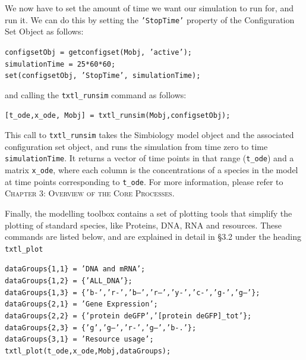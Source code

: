 \documentclass[english]{report}
\begin{document}
We now have to set the amount of time we want our simulation to run for, and run it. We can do this by setting the \texttt{'StopTime'} property of the Configuration Set Object as follows:

				\begin{flushleft}
						\texttt{configsetObj = getconfigset(Mobj, 'active');\\
simulationTime = 25*60*60;\\
set(configsetObj, 'StopTime', simulationTime);} \\	
				\end{flushleft}		
and calling the \texttt{txtl\_runsim} command as follows:	

				\begin{flushleft}
						\texttt{[t\_ode,x\_ode, Mobj] = txtl\_runsim(Mobj,configsetObj);} \\	
				\end{flushleft}	
This call to \texttt{txtl\_runsim} takes the Simbiology model object and the associated configuration set object, and runs the simulation from time zero to time \texttt{simulationTime}. It returns a vector of time points in that range (\texttt{t\_ode}) and a matrix \texttt{x\_ode}, where each column is the concentrations of a species in the model at time points corresponding to \texttt{t\_ode}. For more information, please refer to \textsc{Chapter 3: Overview of the Core Processes}. 

Finally, the modelling toolbox contains a set of plotting tools that simplify the plotting of standard species, like Proteins, DNA, RNA and resources. These commands are listed below, and are explained in detail in \S 3.2 under the heading \texttt{txtl\_plot}

				 \begin{flushleft}
						 \texttt{\noindent dataGroups\{1,1\} = 'DNA and mRNA'; \\
						dataGroups\{1,2\} = \{'ALL\_DNA'\};\\ 
						dataGroups\{1,3\} = \{'b-','r-','b--','r--','y-','c-','g-','g--'\};\\}
						\vspace*{1\baselineskip}
						\texttt{\noindent dataGroups\{2,1\} = 'Gene Expression';\\
						dataGroups\{2,2\} = \{'protein deGFP\textasteriskcentered','[protein deGFP]\_tot'\};\\
						dataGroups\{2,3\} = \{'g','g--','r-','g--','b-.'\};\\}
						\vspace*{1\baselineskip}
						\texttt{\noindent dataGroups\{3,1\} = 'Resource usage';\\}
						\vspace*{1\baselineskip}
						 \texttt{\noindent txtl\_plot(t\_ode,x\_ode,Mobj,dataGroups); \\}
					
				\end{flushleft}
						
\end{document}
